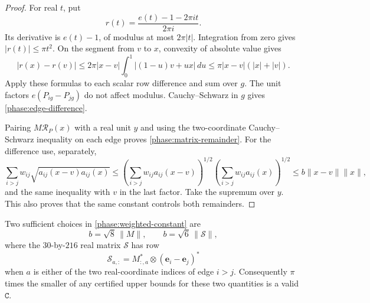 \begin{proof}
For real \(t\), put
\[
 r(t)=\frac{e(t)-1-2\pi i t}{2\pi i}.
\]
Its derivative is \(e(t)-1\), of modulus at most \(2\pi|t|\).
Integration from zero gives \(|r(t)|\leq\pi t^2\).  On the segment from
\(v\) to \(x\), convexity of absolute value gives
\[
 |r(x)-r(v)|
 \leq2\pi|x-v|\int_0^1|(1-u)v+ux|\,du
 \leq\pi|x-v|(|x|+|v|).
\]
Apply these formulas to each scalar row difference and sum over \(g\).
The unit factors \(e(P_{ig}-P_{jg})\) do not affect modulus.
Cauchy--Schwarz in \(g\) gives \eqref{phase:edge-difference}.

Pairing \(M\mathcal R_P(x)\) with a real unit \(y\) and using the
two-coordinate Cauchy--Schwarz inequality on each edge proves
\eqref{phase:matrix-remainder}.  For the difference use, separately,
\[
 \sum_{i>j}w_{ij}
     \sqrt{a_{ij}(x-v)a_{ij}(x)}
 \leq
 \left(\sum_{i>j}w_{ij}a_{ij}(x-v)\right)^{1/2}
 \left(\sum_{i>j}w_{ij}a_{ij}(x)\right)^{1/2}
 \leq b\|x-v\|\|x\|,
\]
and the same inequality with \(v\) in the last factor.  Take the
supremum over \(y\).  This also proves that the same constant controls
both remainders.
\end{proof}

\begin{lemma}
\label{phase:remainder-constants}
Two sufficient choices in \eqref{phase:weighted-constant} are
\[
 b=\sqrt8\,\|M\|,\qquad b=\sqrt6\,\|\mathcal S\|,
\]
where the \(30\)-by-\(216\) real matrix \(\mathcal S\) has row
\[
 \mathcal S_{a,:}
   =M_{:,a}^*\otimes(\mathbf e_i-\mathbf e_j)^*
\]
when \(a\) is either of the two real-coordinate indices of edge
\(i>j\).  Consequently
\(\pi\) times the smaller of any certified upper bounds for these two
quantities is a valid \(\mathtt C\).
\end{lemma}

